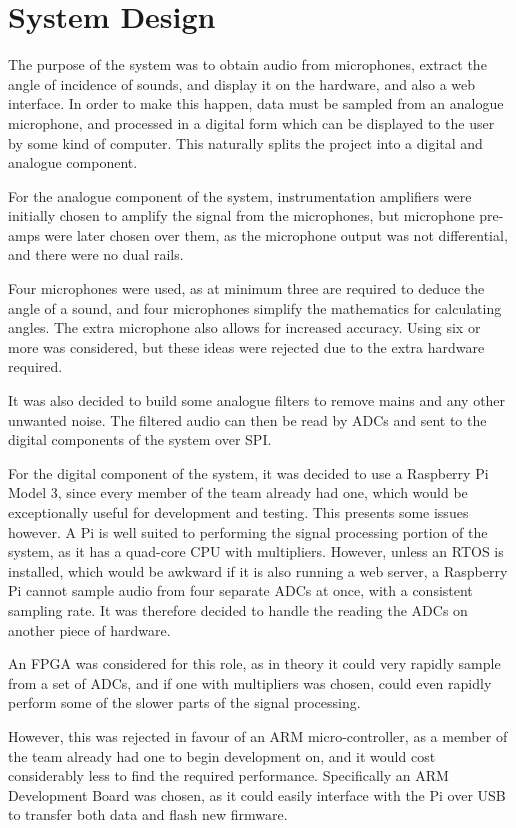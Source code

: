 \documentclass[a4paper]{article}
\begin{document}
\section{System Design}

The purpose of the system was to obtain audio from microphones, extract the
angle of incidence of sounds, and display it on the hardware, and also a web
interface. In order to make this happen, data must be sampled from an analogue
microphone, and processed in a digital form which can be displayed to the user
by some kind of computer. This naturally splits the project into a digital and
analogue component.

For the analogue component of the system, instrumentation amplifiers were
initially chosen to amplify the signal from the microphones, but microphone
pre-amps were later chosen over them, as the microphone output was not
differential, and there were no dual rails.

Four microphones were used, as at minimum three are required to deduce the angle
of a sound, and four microphones simplify the mathematics for calculating
angles. The extra microphone also allows for increased accuracy. Using six or
more was considered, but these ideas were rejected due to the extra hardware
required.

It was also decided to build some analogue filters to remove mains and any other
unwanted noise.  The filtered audio can then be read by ADCs and sent to the
digital components of the system over SPI.

For the digital component of the system, it was decided to use a Raspberry Pi
Model 3, since every member of the team already had one, which would be
exceptionally useful for development and testing. This presents some issues
however. A Pi is well suited to performing the signal processing portion of the
system, as it has a quad-core CPU with multipliers.  However, unless an RTOS is
installed, which would be awkward if it is also running a web server, a
Raspberry Pi cannot sample audio from four separate ADCs at once, with a
consistent sampling rate. It was therefore decided to handle the reading the
ADCs on another piece of hardware.

An FPGA was considered for this role, as in theory it could very rapidly sample
from a set of ADCs, and if one with multipliers was chosen, could even rapidly
perform some of the slower parts of the signal processing.

However, this was rejected in favour of an ARM micro-controller, as a member of
the team already had one to begin development on, and it would cost considerably
less to find the required performance.  Specifically an ARM Development Board
was chosen, as it could easily interface with the Pi over USB to transfer both
data and flash new firmware.
\end{document}
